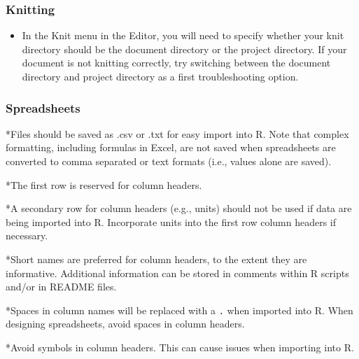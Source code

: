 \documentclass[]{article}
\providecommand{\tightlist}{%
  \setlength{\itemsep}{0pt}\setlength{\parskip}{0pt}}
\begin{document}
\hypertarget{knitting}{%
\subsubsection{Knitting}\label{knitting}}

\begin{itemize}
\tightlist
\item
  In the Knit menu in the Editor, you will need to specify whether your
  knit directory should be the document directory or the project
  directory. If your document is not knitting correctly, try switching
  between the document directory and project directory as a first
  troubleshooting option.
\end{itemize}

\hypertarget{spreadsheets}{%
\subsubsection{Spreadsheets}\label{spreadsheets}}

*Files should be saved as .csv or .txt for easy import into R. Note that
complex formatting, including formulas in Excel, are not saved when
spreadsheets are converted to comma separated or text formats (i.e.,
values alone are saved).

*The first row is reserved for column headers.

*A secondary row for column headers (e.g., units) should not be used if
data are being imported into R. Incorporate units into the first row
column headers if necessary.

*Short names are preferred for column headers, to the extent they are
informative. Additional information can be stored in comments within R
scripts and/or in README files.

*Spaces in column names will be replaced with a \texttt{.} when imported
into R. When designing spreadsheets, avoid spaces in column headers.

*Avoid symbols in column headers. This can cause issues when importing
into R.
\end{document}
